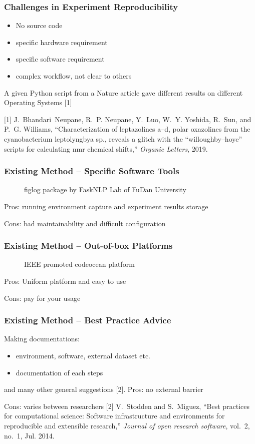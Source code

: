 \documentclass[notheorems]{beamer}
\begin{document}
\begin{frame}
\frametitle{Challenges in Experiment Reproducibility}
\begin{itemize}
\item No source code
\item specific hardware requirement
\item specific software requirement
\item complex workflow, not clear to others
\end{itemize}
\vskip 0.5cm

A given Python script from a Nature article gave different results on different Operating Systems [1]


\vskip 1cm
{\tiny [1] J.~Bhandari~Neupane, R.~P. Neupane, Y.~Luo, W.~Y. Yoshida, R.~Sun, and P.~G.
  Williams, ``Characterization of leptazolines a--d, polar oxazolines from the
  cyanobacterium leptolyngbya sp., reveals a glitch with the
  “willoughby--hoye” scripts for calculating nmr chemical shifts,''
  \emph{Organic Letters}, 2019.
 } 
 
\end{frame}

\begin{frame}
\frametitle{Existing Method -- Specific Software Tools}

\begin{figure}
\caption{figlog package by FaskNLP Lab of FuDan University}
\end{figure}
Pros: running environment capture and experiment results storage

Cons: bad maintainability and difficult configuration
\end{frame}

\begin{frame}
\frametitle{Existing Method -- Out-of-box Platforms}

\begin{figure}
\caption{IEEE promoted codeocean platform}
\end{figure}
Pros: Uniform platform and easy to use

Cons: pay for your usage
\end{frame}

\begin{frame}
\frametitle{Existing Method -- Best Practice Advice}

Making documentations:
\begin{itemize}
\item environment, software, external dataset etc.
\item documentation of each steps
\end{itemize}
and many other general suggestions [2].
\vskip 0.5cm
Pros: no external barrier

Cons: varies between researchers
\vskip 1cm
{\tiny
[2] V.~Stodden and S.~Miguez, ``Best practices for computational science: Software
  infrastructure and environments for reproducible and extensible research,''
  \emph{Journal of open research software}, vol.~2, no.~1, Jul. 2014.
  }
\end{frame}
\end{document}
